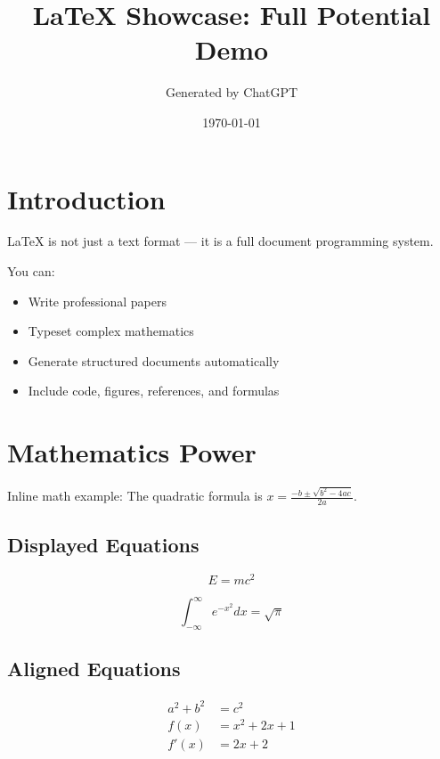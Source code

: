 \documentclass[11pt]{article}
\title{LaTeX Showcase: Full Potential Demo}
\author{Generated by ChatGPT}
\date{\today}
\begin{document}
\maketitle

\tableofcontents
\newpage

\section{Introduction}

LaTeX is not just a text format — it is a full document programming system.

You can:
\begin{itemize}
    \item Write professional papers
    \item Typeset complex mathematics
    \item Generate structured documents automatically
    \item Include code, figures, references, and formulas
\end{itemize}

\section{Mathematics Power}

Inline math example: The quadratic formula is $x = \frac{-b \pm \sqrt{b^2 - 4ac}}{2a}$.

\subsection{Displayed Equations}

\begin{equation}
E = mc^2
\end{equation}

\begin{equation}
\int_{-\infty}^{\infty} e^{-x^2} dx = \sqrt{\pi}
\end{equation}

\subsection{Aligned Equations}

\begin{align}
a^2 + b^2 &= c^2 \\
f(x) &= x^2 + 2x + 1 \\
f'(x) &= 2x + 2
\end{align}
\end{document}
